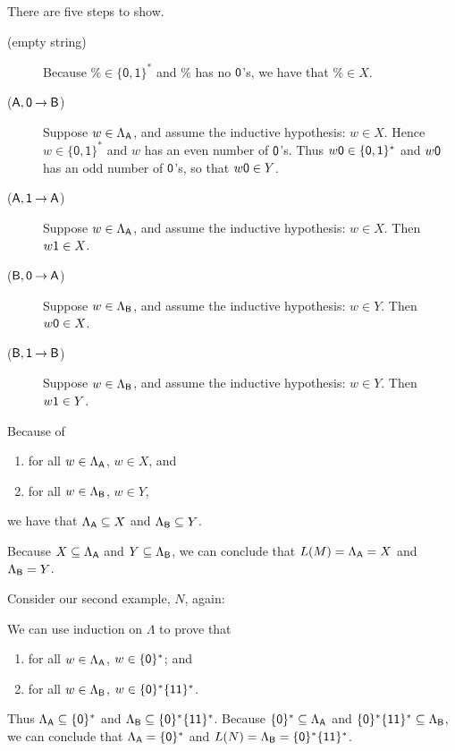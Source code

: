 There are five steps to show.
\begin{description}
\item[\quad(empty string)] Because $\%\in\{\mathsf{0,1}\}^*$ and $\%$
has no $\mathsf{0}$'s, we have that $\%\in X$.

\item[\quad($\mathsf{A}, \mathsf{0}\mathbin{\to}\mathsf{B}$)] Suppose $w\in\Lambda_{\mathsf{A}}$, and
  assume the inductive hypothesis: $w\in X$.  Hence
  $w\in\{\mathsf{0,1}\}^*$ and $w$ has an even number of $\mathsf{0}$'s.
  Thus $w\mathsf{0}\in\{\mathsf{0,1}\}^*$ and $w\mathsf{0}$ has an odd
  number of $\mathsf{0}$'s, so that $w\mathsf{0}\in Y$.
\end{description}

\begin{description}
\item[\quad($\mathsf{A}, \mathsf{1}\mathbin{\to}\mathsf{A}$)] Suppose $w\in\Lambda_{\mathsf{A}}$, and
  assume the inductive hypothesis: $w\in X$.  Then $w\mathsf{1}\in X$.

\item[\quad($\mathsf{B}, \mathsf{0}\mathbin{\to}\mathsf{A}$)] Suppose $w\in\Lambda_{\mathsf{B}}$, and
  assume the inductive hypothesis: $w\in Y$.  Then $w\mathsf{0}\in X$.

\item[\quad($\mathsf{B}, \mathsf{1}\mathbin{\to}\mathsf{B}$)] Suppose $w\in\Lambda_{\mathsf{B}}$, and
  assume the inductive hypothesis: $w\in Y$.  Then $w\mathsf{1}\in Y$.
\end{description}

Because of
\begin{enumerate}[\quad(A)]
\item for all $w\in\Lambda_{\mathsf{A}}$, $w\in X$, and

\item for all $w\in\Lambda_{\mathsf{B}}$, $w\in Y$,
\end{enumerate}
we have that
$\Lambda_{\mathsf{A}} \subseteq X$ and $\Lambda_{\mathsf{B}} \subseteq Y$.

Because $X \subseteq \Lambda_{\mathsf{A}}$ and $Y \subseteq \Lambda_{\mathsf{B}}$, we can
conclude that $L(M) = \Lambda_{\mathsf{A}} = X$ and $\Lambda_{\mathsf{B}} = Y$.

Consider our second example, $N$, again:
\begin{center}

\end{center}

We can use induction on $\Lambda$ to prove that
\begin{enumerate}[\quad(A)]
\item for all $w\in\Lambda_{\mathsf{A}}$, $w\in\{\mathsf{0}\}^*$; and

\item for all $w\in\Lambda_{\mathsf{B}}$, $w\in\{\mathsf{0}\}^*\{\mathsf{11}\}^*$.
\end{enumerate}
Thus $\Lambda_{\mathsf{A}}\subseteq\{\mathsf{0}\}^*$ and
$\Lambda_{\mathsf{B}}\subseteq\{\mathsf{0}\}^*\{\mathsf{11}\}^*$.  Because
$\{\mathsf{0}\}^*\subseteq\Lambda_{\mathsf{A}}$ and
$\{\mathsf{0}\}^*\{\mathsf{11}\}^*\subseteq\Lambda_{\mathsf{B}}$, we can conclude that
$\Lambda_{\mathsf{A}}=\{\mathsf{0}\}^*$ and
$L(N)=\Lambda_{\mathsf{B}}=\{\mathsf{0}\}^*\{\mathsf{11}\}^*$.

